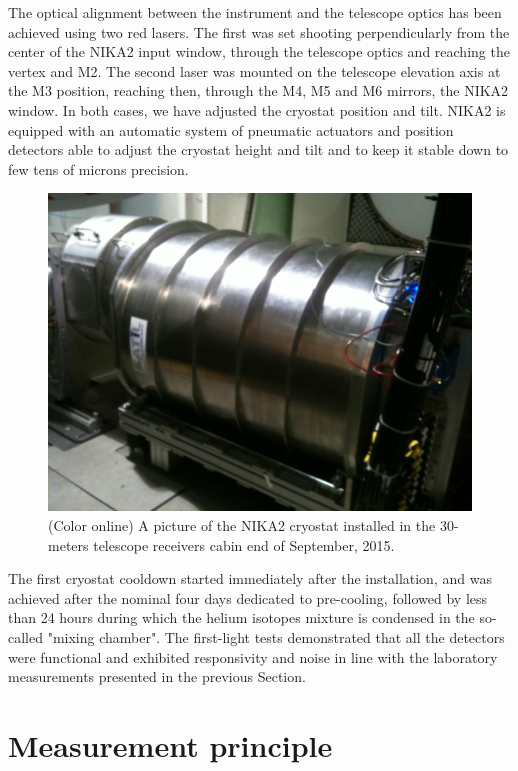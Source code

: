 \documentclass[]{aa} %
\begin{document}
The optical alignment between the instrument and the telescope optics has been achieved using two red lasers. The first was set shooting perpendicularly from the center of the NIKA2 input window, through the telescope optics and reaching the vertex and M2. The second laser was mounted on the telescope elevation axis at the M3 position, reaching then, through the M4, M5 and M6 mirrors, the NIKA2 window. In both cases, we have adjusted the cryostat position and tilt. NIKA2 is equipped with an automatic system of pneumatic actuators and position detectors able to adjust the cryostat height and tilt and to keep it stable down to few tens of microns precision. 

\begin{figure}[h]
   \centering
    \includegraphics[width=.85\linewidth]{NIKA2cryo.jpg}
      \caption{(Color online) A picture of the NIKA2 cryostat installed in the 30-meters telescope receivers cabin end of September, 2015.}
         \label{Fig5}
\end{figure}

The first cryostat cooldown started immediately after the installation, and was achieved after the nominal four days dedicated to pre-cooling, followed by less than 24 hours during which the helium isotopes mixture is condensed in the so-called "mixing chamber". The first-light tests demonstrated that all the detectors were functional and exhibited responsivity and noise in line with the laboratory measurements presented in the previous Section. 


\section{Measurement principle}
\label{Measurement principle}
\end{document}
